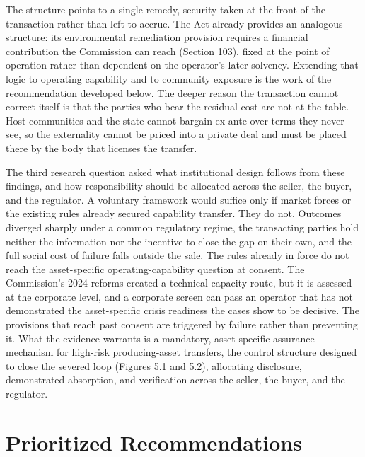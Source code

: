 The structure points to a single remedy, security taken at the front of
the transaction rather than left to accrue. The Act already provides an
analogous structure: its environmental remediation provision requires a
financial contribution the Commission can reach (Section 103), fixed at
the point of operation rather than dependent on the operator's later
solvency. Extending that logic to operating capability and to community
exposure is the work of the recommendation developed below. The deeper
reason the transaction cannot correct itself is that the parties who
bear the residual cost are not at the table. Host communities and the
state cannot bargain ex ante over terms they never see, so the
externality cannot be priced into a private deal and must be placed
there by the body that licenses the transfer.

The third research question asked what institutional design follows from
these findings, and how responsibility should be allocated across the
seller, the buyer, and the regulator. A voluntary framework would
suffice only if market forces or the existing rules already secured
capability transfer. They do not. Outcomes diverged sharply under a
common regulatory regime, the transacting parties hold neither the
information nor the incentive to close the gap on their own, and the
full social cost of failure falls outside the sale. The rules already in
force do not reach the asset-specific operating-capability question at
consent. The Commission's 2024 reforms created a technical-capacity
route, but it is assessed at the corporate level, and a corporate screen
can pass an operator that has not demonstrated the asset-specific crisis
readiness the cases show to be decisive. The provisions that reach past
consent are triggered by failure rather than preventing it. What the
evidence warrants is a mandatory, asset-specific assurance mechanism for
high-risk producing-asset transfers, the control structure designed to
close the severed loop (Figures 5.1 and 5.2), allocating disclosure,
demonstrated absorption, and verification across the seller, the buyer,
and the regulator.

\hypertarget{prioritized-recommendations}{%
\section{Prioritized
Recommendations}\label{prioritized-recommendations}}

